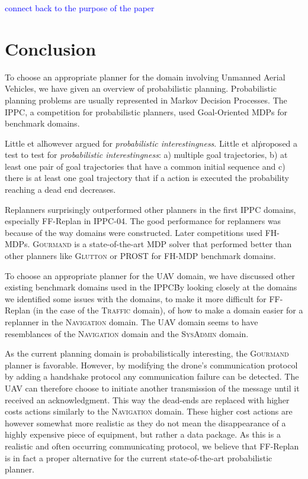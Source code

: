 \documentclass[runningheads,a4paper]{llncs}
\newcommand\todo[1]{\textcolor{blue}{#1}}
\begin{document}
\todo{connect back to the purpose of the paper}


\section{Conclusion}
\label{sec:conclusion}

To choose an appropriate planner for the domain involving Unmanned Aerial
Vehicles, we have given an overview of probabilistic planning. Probabilistic
planning problems are usually represented in Markov Decision Processes. The
IPPC, a competition for probabilistic planners, used Goal-Oriented MDPs for
benchmark domains.

Little et al\. however argued for \emph{probabilistic
interestingness}. Little et al\. proposed a test to test for \emph{probabilistic
interestingness}: a) multiple goal trajectories, b) at least one pair of goal
trajectories that have a common initial sequence and c) there is at least one
goal trajectory that if a action is executed the probability reaching a dead
end decreases.

Replanners surprisingly outperformed other planners in the first IPPC domains,
especially FF-Replan in IPPC-04. The good performance for replanners was
because of the way domains were constructed. Later competitions used FH-MDPs.
\textsc{Gourmand} is a state-of-the-art MDP solver that performed better than
other planners like \textsc{Glutton} or PROST for FH-MDP benchmark domains.

To choose an appropriate planner for the UAV domain, we have discussed other
existing benchmark domains used in the IPPC\. By looking closely at the domains
we identified some issues with the domains, to make it more difficult for
FF-Replan (in the case of the \textsc{Traffic} domain), of how to make a domain
easier for a replanner in the \textsc{Navigation} domain. The UAV domain seems
to have resemblances of the \textsc{Navigation} domain and the
\textsc{SysAdmin} domain.

As the current planning domain is probabilistically interesting, the
\textsc{Gourmand} planner is favorable. However, by modifying the drone's
communication protocol by adding a handshake protocol any communication failure
can be detected. The UAV can therefore choose to initiate another transmission
of the message until it received an acknowledgment. This way the dead-ends are
replaced with higher costs actions similarly to the \textsc{Navigation} domain.
These higher cost actions are however somewhat more realistic as they do not
mean the disappearance of a highly expensive piece of equipment, but rather a
data package. As this is a realistic and often occurring communicating
protocol, we believe that FF-Replan is in fact a proper alternative for the
current state-of-the-art probabilistic planner.
\end{document}
